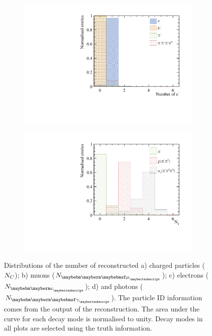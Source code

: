 \begin{figure}[htbp]
\begin{subfigure}[b]{0.45\textwidth}
 \includegraphics[width=\textwidth]{tau/nElectron_100GeV_improved.pdf}
  \caption{}
  \label{fig:tauVarNElectron}
\end{subfigure}
\begin{subfigure}[b]{0.45\textwidth}
 \includegraphics[width=\textwidth]{tau/var2/nPhoton_100GeV_improved.pdf}
  \caption{}
  \label{fig:tauVarNPhoton}
\end{subfigure}
\caption
{Distributions of  the number of reconstructed a)  charged particles (${N}_{C}$); b) muons (${N}_{\Pmu}$); c) electrons (${N}_{\Pe}$); d) and photons (${N}_{\Pgg}$). The particle ID information comes from the output of the \pandora reconstruction. The area under the curve for each decay mode is normalised to unity. Decay modes in all plots are selected using the truth information.}
\label{fig:tauVar1}
\end{figure}


